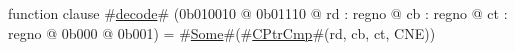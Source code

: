 function clause #\hyperref[zdecode]{decode}# (0b010010 @ 0b01110 @ rd : regno @ cb : regno @ ct : regno @ 0b000 @ 0b001) = #\hyperref[zSome]{Some}#(#\hyperref[zCPtrCmp]{CPtrCmp}#(rd, cb, ct, CNE))
